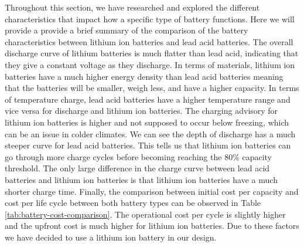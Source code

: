 Throughout this section, we have researched and explored the different characteristics that impact how a specific type of battery functions. Here we will provide a provide a brief summary of the comparison of the battery characteristics between lithium ion batteries and lead acid batteries. The overall discharge curve of lithium batteries is much flatter than lead acid, indicating that they give a constant voltage as they discharge. In terms of materials, lithium ion batteries have a much higher energy density than lead acid batteries meaning that the batteries will be smaller, weigh less, and have a higher capacity.  In terms of temperature charge, lead acid batteries have a higher temperature range and vice versa for discharge and lithium ion batteries. The charging advisory for lithium ion batteries is higher and not supposed to occur below freezing, which can be an issue in colder climates. We can see the depth of discharge has a much steeper curve for lead acid batteries. This tells us that lithium ion batteries can go through more charge cycles before becoming reaching the 80\% capacity threshold. The only large difference in the charge curve between lead acid batteries and lithium ion batteries is that lithium ion batteries have a much shorter charge time. Finally, the comparison between initial cost per capacity and cost per life cycle between both battery types can be observed in Table \ref{tab:battery-cost-comparison}. The operational cost per cycle is slightly higher and the upfront cost is much higher for lithium ion batteries. Due to these factors we have decided to use a lithium ion battery in our design.

